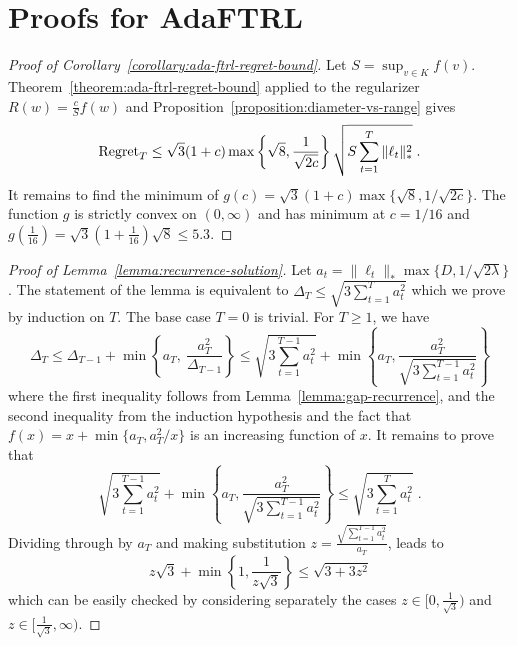 \section{Proofs for AdaFTRL}
\label{section:ada-ftrl-proofs}

\begin{proof}[Proof of Corollary~\ref{corollary:ada-ftrl-regret-bound}]
Let $S = \sup_{v \in K} f(v)$. Theorem~\ref{theorem:ada-ftrl-regret-bound}
applied to the regularizer $R(w) = \frac{c}{S} f(w)$ and
Proposition~\ref{proposition:diameter-vs-range} gives
$$
\operatorname{Regret}_T \le \sqrt{3}(1 + c) \max\left\{\sqrt{8}, \frac{1}{\sqrt{2c}} \right\} \sqrt{S \sum_{t=1}^T \|\ell_t\|_*^2} \; .
$$
It remains to find the minimum of $g(c) = \sqrt{3}(1 + c) \max\{\sqrt{8},
1/\sqrt{2c}\}$.  The function $g$ is strictly convex on $(0, \infty)$ and has
minimum at $c=1/16$ and $g(\frac{1}{16}) = \sqrt{3}(1+\frac{1}{16})\sqrt{8} \le
5.3$.
\end{proof}

\begin{proof}[Proof of Lemma~\ref{lemma:recurrence-solution}]
Let $a_t = \|\ell_t\|_* \max\{D, 1/\sqrt{2\lambda}\}$. The statement of the
lemma is equivalent to $\Delta_T \le \sqrt{3 \sum_{t=1}^T a_t^2}$ which we
prove by induction on $T$.  The base case $T=0$ is trivial. For $T \ge 1$, we
have
$$
\Delta_T
\le \Delta_{T-1} + \min \left\{a_T, \ \frac{a_T^2}{\Delta_{T-1}} \right\}
\le \sqrt{3 \sum_{t=1}^{T-1} a_t^2} + \min \left\{ a_T, \frac{a_T^2}{\sqrt{3 \sum_{t=1}^{T-1} a_t^2}} \right\}
$$
where the first inequality follows from Lemma~\ref{lemma:gap-recurrence}, and
the second inequality from the induction hypothesis and the fact that $f(x) = x
+ \min\{a_T, a_T^2/x\}$ is an increasing function of $x$.  It remains to prove
that
$$
\sqrt{3 \sum_{t=1}^{T-1} a_t^2} + \min \left\{ a_T, \frac{a_T^2}{\sqrt{3 \sum_{t=1}^{T-1} a_t^2}} \right\}
\le  \sqrt{3 \sum_{t=1}^T a_t^2} \; .
$$
Dividing through by $a_T$ and making substitution $z=\frac{\sqrt{\sum_{t=1}^{T-1} a_t^2}}{a_T}$, leads to
$$
z\sqrt{3} + \min\left\{1,\frac{1}{z\sqrt{3}}\right\} \le \sqrt{3 + 3z^2}
$$
which can be easily checked by considering separately the cases $z \in
[0,\frac{1}{\sqrt{3}})$ and $z \in [\frac{1}{\sqrt{3}}, \infty)$.
\end{proof}


